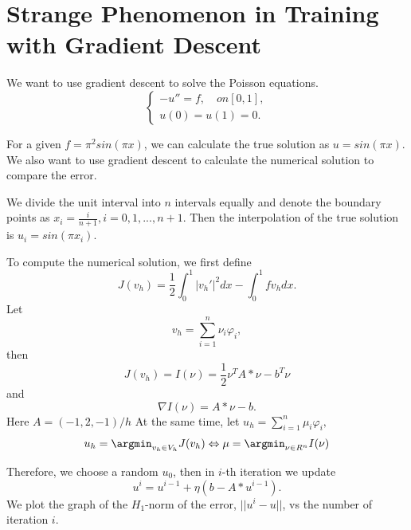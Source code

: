 \section{Strange Phenomenon in Training with Gradient Descent}

We want to use gradient descent to solve the Poisson equations.
\begin{equation}
  \label{BilinearNodalBasis}
  \left\{
  \begin{array}{ll}
-u''=f, \quad on [0,1], \\
u(0)=u(1)=0.
\end{array}
\right.
\end{equation}

For a given $f=\pi^2sin(\pi x) $, we can calculate the true solution as $u=sin(\pi x)$. We also want to use gradient descent to calculate the numerical solution to compare the error.

We divide the unit interval into $n$ intervals equally and denote the boundary points as $x_i=\frac{i}{n+1}, i=0,1,...,n+1$. Then the interpolation of the true solution is $u_i=sin(\pi x_i)$. 

To compute the numerical solution, we first define 
\begin{equation}
J(v_h)=\frac12\int_0^1|v_h'|^2dx-\int_0^1fv_hdx.
\end{equation}
Let 
$$
\displaystyle v_h=\sum_{i=1}^n\nu_i\varphi_i,
$$
then 
$$
J(v_h)=I(\nu)=\frac12\nu^TA\ast\nu-b^T\nu
$$
and 
$$
\nabla I(\nu) =A\ast \nu -b.
$$
Here $A=(-1,2,-1)/h$
At the same time, let $\displaystyle u_h=\sum_{i=1}^n\mu_i\varphi_i,$
\begin{equation}\label{min}
\displaystyle u_h=\argmin_{v_h\in V_h} J(v_h)\Leftrightarrow \mu=\argmin_{\nu \in R^n} I(\nu)
\end{equation}

Therefore, we choose a random $u_0$, then in $i$-th iteration we update
\begin{equation}
u^i=u^{i-1}+\eta(b-A * u^{i-1}).
\end{equation}
We plot the graph of the $H_1$-norm of the error, $||u^i-u||$, vs the number of iteration $i$.


